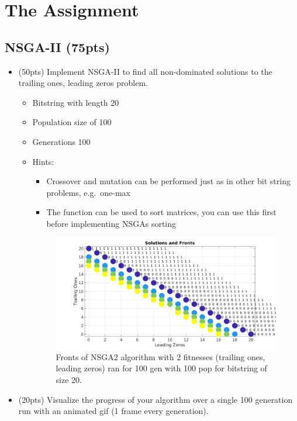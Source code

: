 \documentclass{article}
\begin{document}
\newpage
\section{The Assignment}

\subsection{NSGA-II (75pts)}
\begin{itemize}
	\item (50pts) Implement NSGA-II to find all non-dominated solutions to the trailing ones, leading zeros problem. 
	\begin{itemize}
		\item Bitstring with length 20
		\item Population size of 100
		\item Generations 100
		\item Hints:
		\begin{itemize}
			\item Crossover and mutation can be performed just as in other bit string problems, e.g.\ one-max
			\item The  function can be used to sort matrices, you can use this first before implementing NSGAs sorting
		\end{itemize}
        \begin{figure}[htpb]
            \centering
            \includegraphics[width=1.0\linewidth]{section3point1_bullet1.jpg}
            \caption{Fronts of NSGA2 algorithm with 2 fitnesses (trailing ones, leading zeros) ran for 100 gen with 100 pop for bitstring of size 20.}\label{fig:}
        \end{figure}
	\end{itemize}
    \newpage
	\item (20pts) Visualize the progress of your algorithm over a single 100 generation run with an animated gif (1 frame every generation).

\end{itemize}
\end{document}
